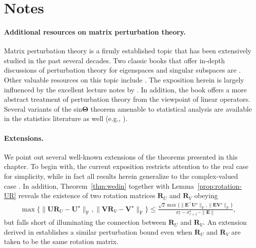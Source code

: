 \section{Notes}


\paragraph{Additional resources on matrix perturbation theory.}
Matrix perturbation theory is a firmly established topic that has been extensively studied in the past several decades.
Two classic books that offer in-depth discussions of  perturbation theory for eigenspaces and singular subspaces are \citet{stewart1990matrix,sun1987perturbation}.
Other valuable resources on this topic include \citet{bhatia2013matrix,horn2012matrix}.
The exposition herein is  largely influenced by the excellent lecture notes by \citet{montanari2011notes,hsu2016notes}.
In addition, the book \citep{kato2013perturbation} offers a more abstract  treatment of perturbation theory from the viewpoint of linear operators. Several variants of the sin$\bm{\Theta}$ theorem amenable to statistical analysis are available in the statistics literature as well (e.g., \citet{MR3371006,vu2013minimaxSPCA,cai2018rate,zhang2018heteroskedastic}). 
%



\paragraph{Extensions.}
We point out several well-known extensions of the theorems presented in this chapter.
To begin with, the current exposition restricts attention to the real case for simplicity, while in fact all results herein generalize to the complex-valued case \citep{stewart1990matrix}. In addition, Theorem~\ref{thm:wedin} together with Lemma~\ref{prop:rotation-UR} reveals the existence of two rotation matrices $\bm{R}_{U}$ and $\bm{R}_{V}$ obeying
%
\begin{align*}
	\max\big\{ \|\bm{U}\bm{R}_{U}-\bm{U}^{\star}\|_{\mathrm{F}}, \|\bm{V}\bm{R}_{V}-\bm{V}^{\star}\|_{\mathrm{F}} \big\}
	\leq\frac{\sqrt{2}\max\big\{ \|\bm{E}^{\top}\bm{U}^{\star}\|_{\mathrm{F}},\|\bm{E}\bm{V}^{\star}\|_{\mathrm{F}}\big\} }{\sigma_{r}^{\star}-\sigma_{r+1}^{\star}-\|\bm{E}\|},
\end{align*}
%
but falls short of illuminating the connection between $\bm{R}_{U}$ and $\bm{R}_{V}$. An extension derived in \citet{dopico2000sintheta} establishes a similar perturbation bound even when $\bm{R}_U$ and $\bm{R}_V$ are taken to be the same rotation matrix.
